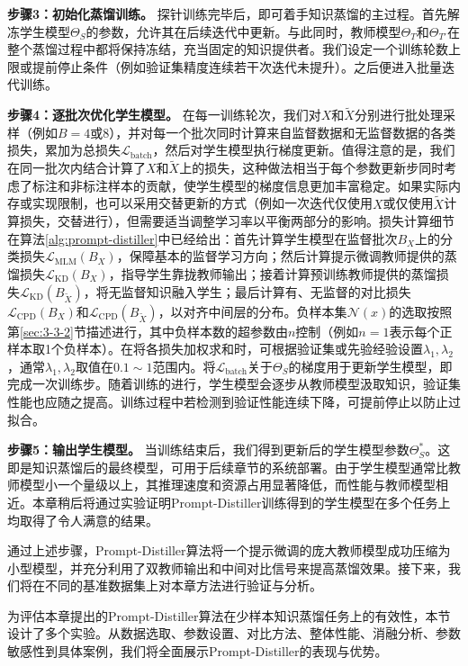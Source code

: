 \documentclass[../main.tex]{subfiles}
\begin{document}
\textbf{步骤3：初始化蒸馏训练。} 探针训练完毕后，即可着手知识蒸馏的主过程。首先解冻学生模型$\Theta_S$的参数，允许其在后续迭代中更新。与此同时，教师模型$\Theta_T$和$\Theta_{T'}$在整个蒸馏过程中都将保持冻结，充当固定的知识提供者。我们设定一个训练轮数上限或提前停止条件（例如验证集精度连续若干次迭代未提升）。之后便进入批量迭代训练。

\textbf{步骤4：逐批次优化学生模型。} 在每一训练轮次，我们对$X$和$\tilde{X}$分别进行批处理采样（例如$B=4$或8），并对每一个批次同时计算来自监督数据和无监督数据的各类损失，累加为总损失$\mathcal{L}_{\text{batch}}$，然后对学生模型执行梯度更新。值得注意的是，我们在同一批次内结合计算了$X$和$\tilde{X}$上的损失，这种做法相当于每个参数更新步同时考虑了标注和非标注样本的贡献，使学生模型的梯度信息更加丰富稳定。如果实际内存或实现限制，也可以采用交替更新的方式（例如一次迭代仅使用$X$或仅使用$\tilde{X}$计算损失，交替进行），但需要适当调整学习率以平衡两部分的影响。损失计算细节在算法\ref{alg:prompt-distiller}中已经给出：首先计算学生模型在监督批次$B_X$上的分类损失$\mathcal{L}_{\text{MLM}}(B_X)$，保障基本的监督学习方向；然后计算提示微调教师提供的蒸馏损失$\mathcal{L}_{\text{KD}}(B_X)$，指导学生靠拢教师输出；接着计算预训练教师提供的蒸馏损失$\mathcal{L}_{\text{KD}}(B_{\tilde{X}})$，将无监督知识融入学生；最后计算有、无监督的对比损失$\mathcal{L}_{\text{CPD}}(B_X)$和$\mathcal{L}_{\text{CPD}}(B_{\tilde{X}})$，以对齐中间层的分布。负样本集$\mathcal{N}(x)$的选取按照第\ref{sec:3-3-2}节描述进行，其中负样本数的超参数由$n$控制（例如$n=1$表示每个正样本取1个负样本）。在将各损失加权求和时，可根据验证集或先验经验设置$\lambda_1,\lambda_2$，通常$\lambda_1,\lambda_2$取值在$0.1\sim1$范围内。将$\mathcal{L}_{\text{batch}}$关于$\Theta_S$的梯度用于更新学生模型，即完成一次训练步。随着训练的进行，学生模型会逐步从教师模型汲取知识，验证集性能也应随之提高。训练过程中若检测到验证性能连续下降，可提前停止以防止过拟合。

\textbf{步骤5：输出学生模型。} 当训练结束后，我们得到更新后的学生模型参数$\Theta_S^*$。这即是知识蒸馏后的最终模型，可用于后续章节的系统部署。由于学生模型通常比教师模型小一个量级以上，其推理速度和资源占用显著降低，而性能与教师模型相近。本章稍后将通过实验证明Prompt-Distiller训练得到的学生模型在多个任务上均取得了令人满意的结果。

通过上述步骤，Prompt-Distiller算法将一个提示微调的庞大教师模型成功压缩为小型模型，并充分利用了双教师输出和中间对比信号来提高蒸馏效果。接下来，我们将在不同的基准数据集上对本章方法进行验证与分析。

\label{sec:3-5}
为评估本章提出的Prompt-Distiller算法在少样本知识蒸馏任务上的有效性，本节设计了多个实验。从数据选取、参数设置、对比方法、整体性能、消融分析、参数敏感性到具体案例，我们将全面展示Prompt-Distiller的表现与优势。
\end{document}
